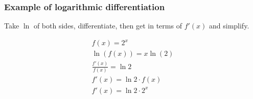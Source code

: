 \subsubsection{Example of logarithmic differentiation}

\begin{center}
    Take $\ln$ of both sides, differentiate, then get in terms of $f'(x)$ and simplify.
\end{center}

\begin{gather*}
    f(x)=2^x\\
    \ln(f(x))=x\ln(2)\\
    \frac{f'(x)}{f(x)}=\ln{2}\\
    f'(x)=\ln{2}\cdot f(x)\\
    f'(x)=\ln{2}\cdot 2^x\\
\end{gather*}
